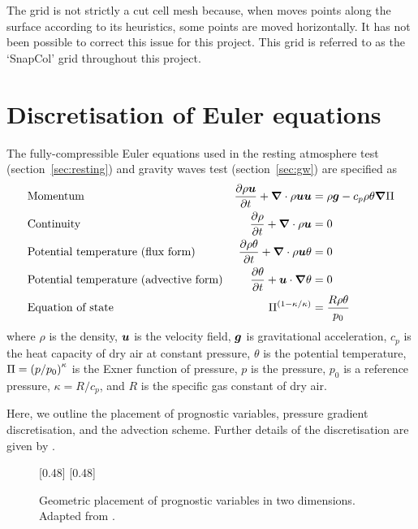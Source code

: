 The grid is not strictly a cut cell mesh because, when  moves points along the surface according to its heuristics, some points are moved horizontally.  It has not been possible to correct this issue for this project.  This grid is referred to as the `SnapCol' grid throughout this project.


\section{Discretisation of Euler equations}
\label{sec:method:discretisation}


The fully-compressible Euler equations used in the resting atmosphere test (section~\ref{sec:resting}) and gravity waves test (section~\ref{sec:gw}) are specified as
\begin{align}
& \text{Momentum} & \frac{\partial \rho \vect{u}}{\partial t} + \del \cdot \rho \vect{u} \vect{u} &= \rho \vect{g} - c_p \rho \theta \del \exner \label{eqn:method:momentum} \\
%
& \text{Continuity} & \frac{\partial \rho}{\partial t} + \del \cdot \rho \vect{u} &= 0 \label{eqn:method:continuity} \\
%
& \text{Potential temperature (flux form)} & \frac{\partial \rho \theta}{\partial t} + \del \cdot \rho \vect{u} \theta &= 0 \\
%
& \text{Potential temperature (advective form)} & \frac{\partial \theta}{\partial t} + \vect{u} \cdot \del \theta &= 0 \\
%
& \text{Equation of state} & \exner^{(1 - \kappa / \kappa)} &= \frac{R \rho \theta}{p_0}
\end{align}
where $\rho$ is the density, $\bm{u}$ is the velocity field, $\bm{g}$ is gravitational acceleration, $c_p$ is the heat capacity of dry air at constant pressure, $\theta$ is the potential temperature, $\Pi = \left( p / p_0 \right)^\kappa$ is the Exner function of pressure, $p$ is the pressure, $p_0$ is a reference pressure, $\kappa = R/c_p$, and $R$ is the specific gas constant of dry air.

Here, we outline the placement of prognostic variables, pressure gradient discretisation, and the advection scheme.  Further details of the discretisation are given by \textcite{weller-shahrokhi2014}.

\begin{figure}
\captionsetup[subfigure]{position=b}
\centering
{}[0.48\textwidth]{}
\hfill
{}[0.48\textwidth]{}
\caption{Geometric placement of prognostic variables in two dimensions.  Adapted from \textcite{weller-shahrokhi2014}.}
\label{fig:method:placement}
\end{figure}

